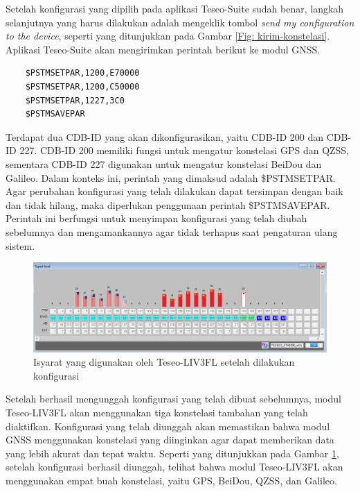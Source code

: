 Setelah konfigurasi yang dipilih pada aplikasi Teseo-Suite sudah benar, langkah selanjutnya yang harus dilakukan adalah mengeklik tombol \textit{send my configuration to the device}, seperti yang ditunjukkan pada Gambar \ref{Fig: kirim-konstelasi}. Aplikasi Teseo-Suite akan mengirimkan perintah berikut ke modul GNSS.

\begin{verbatim}
	$PSTMSETPAR,1200,E70000
	$PSTMSETPAR,1200,C50000
	$PSTMSETPAR,1227,3C0
	$PSTMSAVEPAR
\end{verbatim}

Terdapat dua CDB-ID yang akan dikonfigurasikan, yaitu CDB-ID 200 dan CDB-ID 227. CDB-ID 200 memiliki fungsi untuk mengatur konstelasi GPS dan QZSS, sementara CDB-ID 227 digunakan untuk mengatur konstelasi BeiDou dan Galileo. Dalam konteks ini, perintah yang dimaksud adalah \$PSTMSETPAR. Agar perubahan konfigurasi yang telah dilakukan dapat tersimpan dengan baik dan tidak hilang, maka diperlukan penggunaan perintah \$PSTMSAVEPAR. Perintah ini berfungsi untuk menyimpan konfigurasi yang telah diubah sebelumnya dan mengamankannya agar tidak terhapus saat pengaturan ulang sistem. 

\begin{figure}[H]
	\centering
	\captionsetup{justification=centering}
	\includegraphics[width=14cm]{contents/chapter-3/setting-konstelasi/setelah-konfigurasi.png}
	\caption{Isyarat yang digunakan oleh Teseo\hyp{}LIV3FL setelah dilakukan konfigurasi}
	\label{Fig: setelah-konfigurasi}
\end{figure}

Setelah berhasil mengunggah konfigurasi yang telah dibuat sebelumnya, modul Teseo\hyp{}LIV3FL akan menggunakan tiga konstelasi tambahan yang telah diaktifkan. Konfigurasi yang telah diunggah akan memastikan bahwa modul GNSS menggunakan konstelasi yang diinginkan agar dapat memberikan data yang lebih akurat dan tepat waktu. Seperti yang ditunjukkan pada Gambar \ref{Fig: setelah-konfigurasi}, setelah konfigurasi berhasil diunggah, telihat bahwa modul Teseo\hyp{}LIV3FL akan menggunakan empat buah konstelasi, yaitu GPS, BeiDou, QZSS, dan Galileo. 

